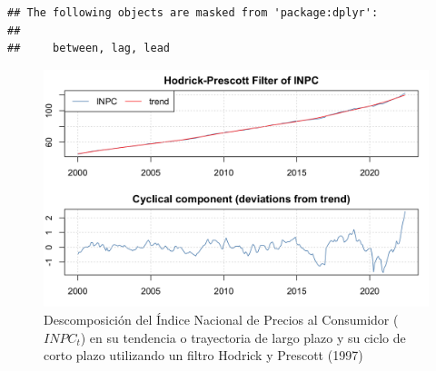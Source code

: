 \documentclass[
]{book}
\newenvironment{Shaded}{\begin{snugshade}}{\end{snugshade}}
\newcommand{\AttributeTok}[1]{\textcolor[rgb]{0.13,0.29,0.53}{#1}}
\newcommand{\CommentTok}[1]{\textcolor[rgb]{0.56,0.35,0.01}{\textit{#1}}}
\newcommand{\DecValTok}[1]{\textcolor[rgb]{0.00,0.00,0.81}{#1}}
\newcommand{\FunctionTok}[1]{\textcolor[rgb]{0.13,0.29,0.53}{\textbf{#1}}}
\newcommand{\NormalTok}[1]{#1}
\newcommand{\OtherTok}[1]{\textcolor[rgb]{0.56,0.35,0.01}{#1}}
\newcommand{\SpecialCharTok}[1]{\textcolor[rgb]{0.81,0.36,0.00}{\textbf{#1}}}
\newcommand{\StringTok}[1]{\textcolor[rgb]{0.31,0.60,0.02}{#1}}
\begin{document}
\begin{verbatim}
## The following objects are masked from 'package:dplyr':
## 
##     between, lag, lead
\end{verbatim}

\begin{Shaded}
\end{Shaded}

\begin{figure}

{\centering \includegraphics[width=0.95\linewidth]{Plots/G_INPC_HP} 

}

\caption{Descomposición del Índice Nacional de Precios al Consumidor ($INPC_t$) en su tendencia o trayectoria de largo plazo y su ciclo de corto plazo utilizando un filtro Hodrick y Prescott (1997)}\label{fig:fig52}
\end{figure}
\end{document}
